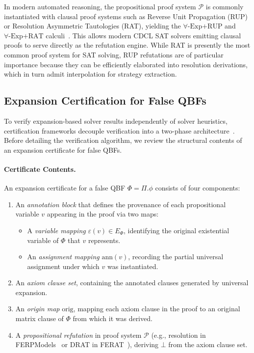 \documentclass[runningheads]{llncs}
\begin{document}
In modern automated reasoning, the propositional proof system $\mathcal{P}$ is commonly instantiated with clausal proof systems such as Reverse Unit Propagation (RUP) or Resolution Asymmetric Tautologies (RAT), yielding the $\forall\text{-}\mathrm{Exp}\text{+RUP}$ and $\forall\text{-}\mathrm{Exp}\text{+RAT}$ calculi~\cite{ferat}.
This allows modern CDCL SAT solvers emitting clausal proofs to serve directly as the refutation engine.
While RAT is presently the most common proof system for SAT solving, RUP refutations are of particular importance because they can be efficiently elaborated into resolution derivations, which in turn admit interpolation for strategy extraction.

\subsection{Expansion Certification for False QBFs}
\label{subsec:false-cert}

To verify expansion-based solver results independently of solver heuristics, certification frameworks decouple verification into a two-phase architecture~\cite{ferpmodels, ferat}.
Before detailing the verification algorithm, we review the structural contents of an expansion certificate for false QBFs.

\paragraph*{Certificate Contents.}
An expansion certificate for a false QBF $\Phi = \Pi.\phi$ consists of four components:
\begin{enumerate}
    \item An \emph{annotation block} that defines the provenance of each propositional variable $v$ appearing in the proof via two maps:
          \begin{itemize}
              \item A \emph{variable mapping} $\varepsilon(v) \in E_\Phi$, identifying the original existential variable of $\Phi$ that $v$ represents.
              \item An \emph{assignment mapping} $\mathrm{ann}(v)$, recording the partial universal assignment under which $v$ was instantiated.
          \end{itemize}
    \item An \emph{axiom clause set}, containing the annotated clauses generated by universal expansion.
    \item An \emph{origin map} $\mathrm{orig}$, mapping each axiom clause in the proof to an original matrix clause of $\Phi$ from which it was derived.
    \item A \emph{propositional refutation} in proof system $\mathcal{P}$ (e.g., resolution in FERPModels~\cite{ferpmodels} or DRAT in FERAT~\cite{ferat}), deriving $\bot$ from the axiom clause set.
\end{enumerate}
\end{document}
